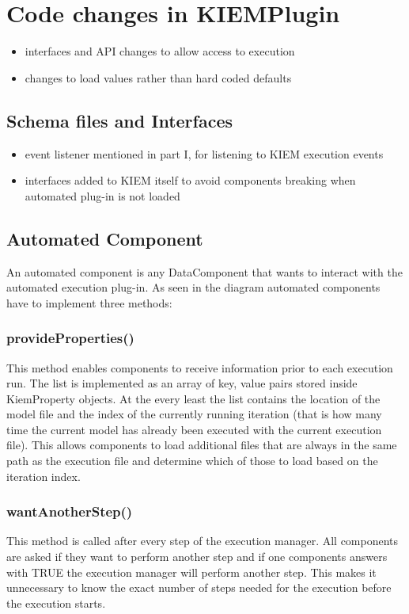 \chapter{Code changes in KIEMPlugin}
\label{chapter:AutoKiemChanges}
\begin{itemize}
 \item interfaces and API changes to allow access to execution
 \item changes to load values rather than hard coded defaults
\end{itemize}

\section{Schema files and Interfaces}
\begin{itemize}
 \item event listener mentioned in part I, for listening to KIEM execution
 events
 \item interfaces added to KIEM itself to avoid components breaking when
 automated plug-in is not loaded
\end{itemize}

\section{Automated Component}
An automated component is any DataComponent that wants to interact with
the automated execution plug-in. As seen in the diagram automated components
have to implement three methods:

\subsection{provideProperties()}
This method enables components to receive information prior to each execution
run. The list is implemented as an array of key, value pairs stored inside
KiemProperty objects.
At the every least the list contains the location of the model file and the
index of the currently running iteration (that is how many time the current
model has already been executed with the current execution file).
This allows components to load additional files that are always in the
same path as the execution file and determine which of those to load
based on the iteration index.

\subsection{wantAnotherStep()}
This method is called after every step of the execution manager.
All components are asked if they want to perform another step and if
one components answers with TRUE the execution manager will perform another
step.
This makes it unnecessary to know the exact number of steps needed for
the execution before the execution starts.

